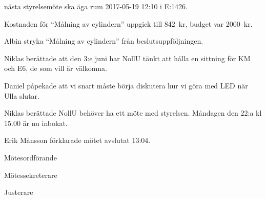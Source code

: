 \documentclass[10pt]{article}
\def\mo{Erik Månsson}
\def\ms{Johan Karlberg}
\def\ji{Niklas Gustafson}
\begin{document}
\begin{paragrafer}
{\Mba} nästa styrelsemöte ska äga rum 2017-05-19 12:10 i E:1426.


Kostnaden för ``Målning av cylindern'' uppgick till \SI{842}{kr}, budget var \SI{2000}{kr}.

Albin \ypa stryka ``Målning av cylindern'' från beslutsuppföljningen.

\Mbaby

Niklas berättade att den 3:e juni har NollU tänkt att hålla en sittning för KM och E6, de som vill är välkomna.

Daniel påpekade att vi snart måste börja diskutera hur vi göra med LED när Ulla slutar.

Niklas berättade NollU behöver ha ett möte med styrelsen. Måndagen den 22:a kl 15.00 är nu inbokat.

{\mo} förklarade mötet avslutat 13:04.

\end{paragrafer}

\newpage
\hidesignfoot
\begin{signatures}{3}
\signature{\mo}{Mötesordförande}
\signature{\ms}{Mötessekreterare}
\signature{\ji}{Justerare}
\end{signatures}
\end{document}
